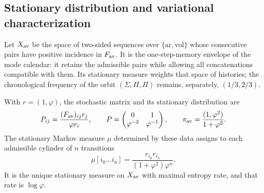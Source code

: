 \subsection{Stationary distribution and variational characterization}
\label{v:v:subsec:parry-explicita}

Let \(X_{\rm av}\) be the space of two-sided sequences over
\(\{\mathrm{ar},\mathrm{vol}\}\) whose consecutive pairs have
positive incidence in \(F_{\rm av}\). It is the one-step-memory envelope
of the mode calendar: it retains the admissible pairs while allowing
all concatenations compatible with them. Its stationary
measure weights that space of histories; the chronological frequency
of the orbit \((\Sigma,\Pi,\Pi)\) remains, separately,
\((1/3,2/3)\).

\begin{proposition}
\label{v:v:prop:parry-explicita}
With \(r=(1,\varphi)\), the stochastic matrix and its stationary
distribution are
\begin{equation}
 P_{ij}=\frac{(F_{\rm av})_{ij}r_j}{\varphi r_i},\qquad
 P=\begin{pmatrix}0&1\\\varphi^{-2}&\varphi^{-1}\end{pmatrix},
 \qquad
 \pi_{\rm av}=\frac{(1,\varphi^2)}{1+\varphi^2}.
 \label{v:v:eq:parry-transicion-estacionaria}
\end{equation}
The stationary Markov measure \(\mu\) determined by these data
assigns to each admissible cylinder of \(n\) transitions
\begin{equation}
 \mu[i_0\ldots i_n]
 =\frac{r_{i_0}r_{i_n}}{(1+\varphi^2)\varphi^n}.
 \label{v:v:eq:parry-cilindros}
\end{equation}
It is the unique stationary measure on \(X_{\rm av}\) with maximal
entropy rate, and that rate is \(\log\varphi\).
\end{proposition}

